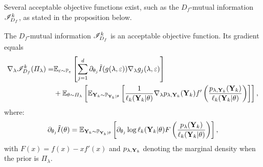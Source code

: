 Several acceptable objective functions exist, such as the $D_f$-mutual information $\mathscr{I}_{D_f}^k$, as stated in the proposition below.
\begin{prop}
    The $D_f$-mutual information $\mathscr{I}^k_{D_f}$ is an acceptable objective function. Its gradient equals
    \begin{align}\label{eq:gradientIdf}
        \nabla_\lambda \mathscr{I}_{D_f}^k(\varPi_{\lambda}) =& \mathbb{E}_{\varepsilon\sim\mathbb{P}_\varepsilon}\left[\sum_{j=1}^d\partial_{\theta_j} \Tilde{I}(g(\lambda,\varepsilon))\nabla_\lambda g_j(\lambda,\varepsilon)\right] \\
        &+ \mathbb{E}_{\theta \sim \varPi_{\lambda}}\left[ \mathbb{E}_{\mathbf{Y}_k \sim\mathbb{P}_{\mathbf{Y}_k|\theta}}\left[ \frac{1}{\ell_k(\mathbf{Y}_k |\theta)} \nabla_\lambda p_{\lambda,\mathbf{Y}_k}(\mathbf{Y}_k)f'\left( \frac{p_{\lambda,\mathbf{Y}_k}(\mathbf{Y}_k)}{\ell_k(\mathbf{Y}_k |\theta)}\right)\right]  \right],\nonumber
        \end{align}
        where:
        \begin{equation}\label{eq:VARP:exprgradtildeI}
            \partial_{\theta_j} \Tilde{I}(\theta) = \mathbb{E}_{\mathbf{Y}_k \sim\mathbb{P}_{\mathbf{Y}_k|\theta}}\left[ \partial_{\theta_j} \log \ell_k(\mathbf{Y}_k |\theta)F \left(\frac{p_{\lambda}(\mathbf{Y}_k)}{\ell_k(\mathbf{Y}_k|\theta)} \right)  \right], 
        \end{equation}
        with $F(x) = f(x)-xf'(x)$ and $p_{\lambda,\mathbf{Y}_k}$ denoting the marginal density when the prior is $\varPi_\lambda$.
\end{prop}

